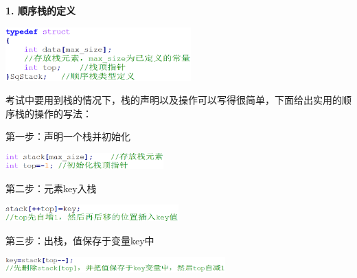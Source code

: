 \textbf{1. 顺序栈的定义}

\includegraphics[width=2.81250in,height=0.81250in]{png-jpeg-pics/2808EF0D96046F76E3FF790F53B095F9.png}

考试中要用到栈的情况下，栈的声明以及操作可以写得很简单，下面给出实用的顺序栈的操作的写法：

{第一步：声明一个栈并初始化}

\includegraphics[width=2.39583in,height=0.23958in]{png-jpeg-pics/22CC74812EFCAA95829A01124BAA5E26.png}

{第二步：元素key入栈}

\includegraphics[width=2.62500in,height=0.25000in]{png-jpeg-pics/C052107CCE72649B9D5CC0ADBFEA8C17.png}

{第三步：出栈，值保存于变量key中}

\includegraphics[width=3.33333in,height=0.23958in]{png-jpeg-pics/0800C6447573DC9A35298FF4895F511C.png}
